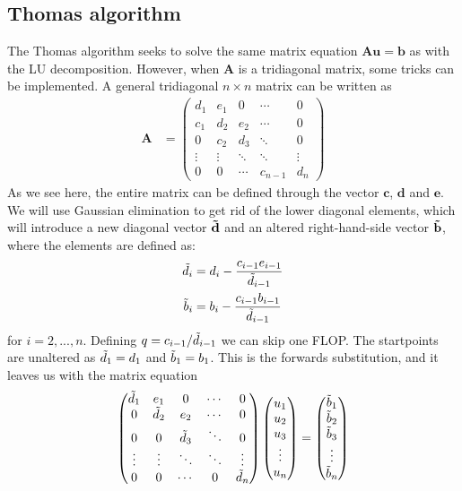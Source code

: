 \documentclass[english]{article}
\renewcommand{\vec}{\mathbf} %
\begin{document}
\subsection{Thomas algorithm}
The Thomas algorithm seeks to solve the same matrix equation $\vec{A}\vec{u}=\vec{b}$ as with the LU decomposition. However, when $\vec{A}$ is a tridiagonal matrix, some tricks can be implemented. A general tridiagonal $n\times n$ matrix can be written as
\begin{align*}
    \vec{A} &=
    \begin{pmatrix}
        d_1 & e_1 & 0 & \cdots & 0 \\
        c_1 & d_2 & e_2 & \cdots & 0 \\
        0 & c_2 & d_3 & \ddots & 0\\
        \vdots  & \vdots  & \ddots & \ddots & \vdots  \\
        0 & 0 & \cdots & c_{n-1} & d_n 
    \end{pmatrix}
\end{align*}
As we see here, the entire matrix can be defined through the vector $\vec{c}$, $\vec{d}$ and $\vec{e}$. We will use Gaussian elimination to get rid of the lower diagonal elements, which will introduce a new diagonal vector  $\vec{\Tilde{d}}$ and an altered right-hand-side vector $\vec{\Tilde{b}}$, where the elements are defined as:
\begin{align*}
    \Tilde{d}_i &= d_i - \frac{c_{i-1}e_{i-1}}{\Tilde{d}_{i-1}} \\
    \Tilde{b}_i &= b_i - \frac{c_{i-1}b_{i-1}}{\Tilde{d}_{i-1}}
\end{align*}
for $i = 2, ..., n$. Defining $q=c_{i-1}/\Tilde{d}_{i-1}$ we can skip one FLOP. The startpoints are unaltered as $\Tilde{d}_1 = d_1$ and $\Tilde{b}_1 = b_1$. This is the forwards substitution, and it leaves us with the matrix equation
\begin{align*}
    \begin{pmatrix}
        \Tilde{d}_1 & e_1 & 0 & \cdots & 0 \\
        0 & \Tilde{d}_2 & e_2 & \cdots & 0 \\
        0 & 0 & \Tilde{d}_3 & \ddots & 0 \\
        \vdots  & \vdots  & \ddots & \ddots & \vdots \\
        0 & 0 & \cdots & 0 & \Tilde{d}_n 
    \end{pmatrix}
    \begin{pmatrix}
        u_1 \\ u_2 \\ u_3 \\ \vdots \\ u_n
    \end{pmatrix}
    = 
    \begin{pmatrix}
        \Tilde{b}_1 \\ \Tilde{b}_2 \\ \Tilde{b}_3 \\ \vdots \\ \Tilde{b}_n
    \end{pmatrix}
\end{align*}
\end{document}
